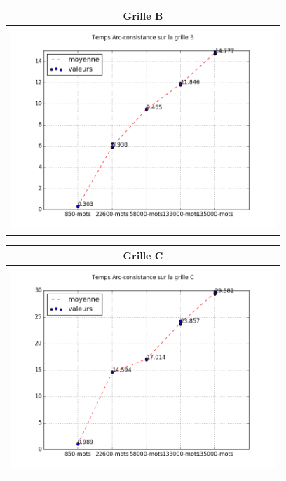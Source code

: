 \documentclass[a4paper,12pt]{report}
\begin{document}
\begin{enumerate}
\begin{table}[!h]
\begin{center}
\begin{tabular}{|c|}
\hline
Grille B \\
\hline 
\\
\includegraphics[width=10cm]{AC3_B.png} \\
\hline

\end{tabular}
\end{center}
\end{table}


\begin{table}[!h]
\begin{center}
\begin{tabular}{|c|}
\hline
Grille C\\
\hline
  \\
\includegraphics[width=10cm]{AC3_C.png} \\
\hline

\end{tabular}
\end{center}
\end{table}


\end{enumerate}
\end{document}
